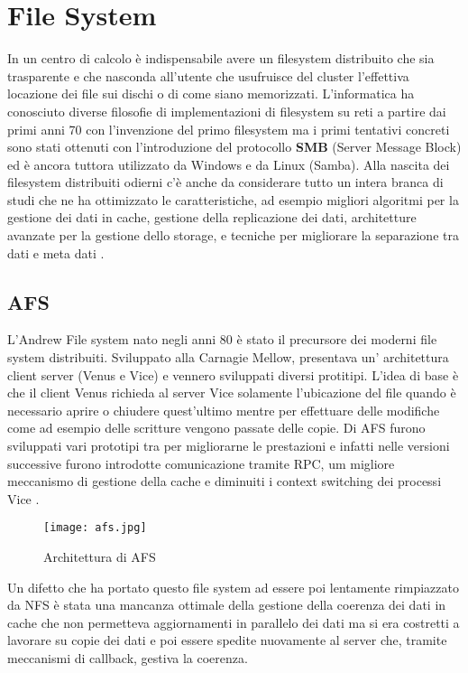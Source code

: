 \section{File System} 
In un centro di calcolo è indispensabile avere un filesystem distribuito che sia trasparente e che nasconda all'utente che usufruisce del cluster l'effettiva locazione dei file sui dischi o di come siano memorizzati. L'informatica ha conosciuto diverse filosofie di implementazioni di filesystem su reti a partire dai primi anni 70 con l'invenzione del primo filesystem ma i primi tentativi concreti sono stati ottenuti con l'introduzione del protocollo \textbf{SMB} (Server Message Block) ed è ancora tuttora utilizzato da Windows e da Linux (Samba). Alla nascita dei filesystem distribuiti odierni c'è anche da considerare tutto un intera branca di studi che ne ha ottimizzato le caratteristiche, ad esempio migliori algoritmi per la gestione dei dati in cache\cite{dahlin94}, gestione della replicazione dei dati\cite{petersen97}, architetture avanzate per la gestione dello storage\cite{gibson98}, e tecniche per migliorare la separazione tra dati e meta dati \cite{thekkat94}.
\subsection{AFS}
L'Andrew File system nato negli anni 80 è stato il precursore dei moderni file system distribuiti. Sviluppato alla Carnagie Mellow, presentava un' architettura client server (Venus e Vice) e vennero sviluppati diversi protitipi. L'idea di base è che il client Venus richieda al server Vice solamente l'ubicazione del file quando è necessario aprire o chiudere quest'ultimo mentre per effettuare delle modifiche come ad esempio delle scritture vengono passate delle copie. Di AFS furono sviluppati vari prototipi tra per migliorarne le prestazioni e infatti nelle versioni successive furono introdotte comunicazione tramite RPC, um migliore meccanismo di gestione della cache e diminuiti i context switching dei processi Vice \cite{howard88}.
\begin{figure}[H]
  \begin{center}
    \texttt{[image: afs.jpg]}
    \caption{Architettura di AFS}
    \label{fg:afs.jpg}
  \end{center}
\end{figure}
Un difetto che ha portato questo file system ad essere poi lentamente rimpiazzato da NFS è stata una mancanza ottimale della gestione della coerenza dei dati in cache che non permetteva aggiornamenti in parallelo dei dati ma si era costretti a lavorare su copie dei dati e poi essere spedite nuovamente al server che, tramite meccanismi di callback, gestiva la coerenza.
